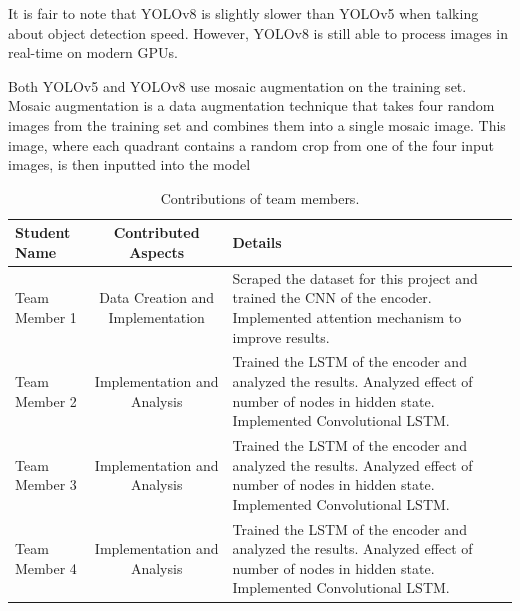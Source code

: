 \documentclass[10pt,twocolumn,letterpaper]{article}
\begin{document}
It is fair to note that YOLOv8 is slightly slower than YOLOv5 when talking about object detection speed. However, YOLOv8 is still able to process images in real-time on modern GPUs.

Both YOLOv5 and YOLOv8 use mosaic augmentation on the training set. Mosaic augmentation is a data augmentation technique that takes four random images from the training set and combines them into a single mosaic image. This image, where each quadrant contains a random crop from one of the four input images, is then inputted into the model ~\cite{MosaicAug}


\newpage
\newpage

														 
{\small


}

\begin{table}
\begin{center}			  
\begin{tabular}{|l|c|p{8cm}|}
\hline
Student Name & Contributed Aspects & Details \\
\hline\hline
Team Member 1 & Data Creation and Implementation & Scraped the dataset for this project and trained the CNN of the encoder. Implemented attention mechanism to improve results. \\
Team Member 2 & Implementation and Analysis & Trained the LSTM of the encoder and analyzed the results. Analyzed effect of number of nodes in hidden state.  Implemented Convolutional LSTM. \\
Team Member 3 & Implementation and Analysis & Trained the LSTM of the encoder and analyzed the results. Analyzed effect of number of nodes in hidden state.  Implemented Convolutional LSTM. \\
Team Member 4 & Implementation and Analysis & Trained the LSTM of the encoder and analyzed the results. Analyzed effect of number of nodes in hidden state.  Implemented Convolutional LSTM. \\
\hline
\end{tabular}
\end{center}
\caption{Contributions of team members.}
\label{tab:contributions}
\end{table}
\end{document}
